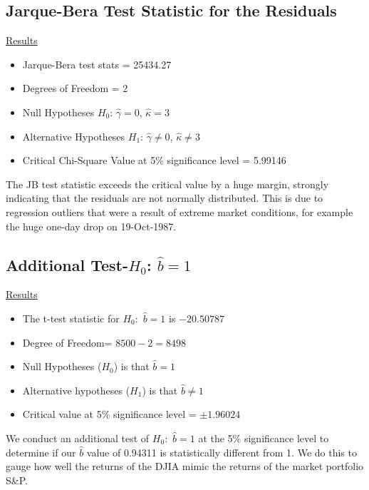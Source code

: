 \documentclass[a4paper]{article}
\begin{document}
	\subsection{Jarque-Bera Test Statistic for the Residuals}
	\underline{Results}
	\begin{itemize}[nosep]
		\item Jarque-Bera test stats = 25434.27
		\item Degrees of Freedom = 2
		\item Null Hypotheses $H_0$: $\hat{\gamma} = 0$, $\hat{\kappa} = 3$
		\item Alternative Hypotheses $H_1$: $\hat{\gamma} \ne 0$, $\hat{\kappa} \ne 3$
		\item Critical Chi-Square Value at 5\% significance level = 5.99146
	\end{itemize}
	
	The JB test statistic exceeds the critical value by a huge margin, strongly indicating that the residuals are not normally distributed. This is due to regression outliers that were a result of extreme market conditions, for example the huge one-day drop on 19-Oct-1987. 
	

	\subsection{Additional Test-$H_0$: $\hat{b}=1$}
	\underline{Results}
	\begin{itemize}[nosep]
		\item The t-test statistic for $H_{0}:$ $\hat{b}=1$ is $-20.50787$
		\item Degree of Freedom= $8500 - 2 = 8498$
		\item Null Hypotheses ($H_0$) is that $\hat{b}=1$
		\item Alternative hypotheses ($H_1$) is that $\hat{b} \ne 1$
		\item Critical value at 5\% significance level = $\pm 1.96024$
	\end{itemize}

	We conduct an additional test of  $H_{0}:$ $\hat{b}=1$ at the 5\% significance level to determine if our $\hat{b}$ value of 0.94311 is statistically different from 1. We do this to gauge how well the returns of the DJIA mimic the returns of the market portfolio S\&P.
	
\end{document}
